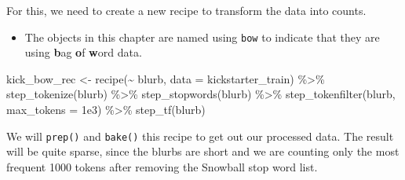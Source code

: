 \documentclass[
]{krantz}
\makeatletter
\newenvironment{Shaded}{\begin{snugshade}}{\end{snugshade}}
\newcommand{\AttributeTok}[1]{\textcolor[rgb]{0.77,0.63,0.00}{#1}}
\newcommand{\DecValTok}[1]{\textcolor[rgb]{0.00,0.00,0.81}{#1}}
\newcommand{\FloatTok}[1]{\textcolor[rgb]{0.00,0.00,0.81}{#1}}
\newcommand{\FunctionTok}[1]{\textcolor[rgb]{0.00,0.00,0.00}{#1}}
\newcommand{\NormalTok}[1]{#1}
\newcommand{\OtherTok}[1]{\textcolor[rgb]{0.56,0.35,0.01}{#1}}
\newcommand{\SpecialCharTok}[1]{\textcolor[rgb]{0.00,0.00,0.00}{#1}}
\newcommand{\StringTok}[1]{\textcolor[rgb]{0.31,0.60,0.02}{#1}}
\newenvironment{kframe}{%
\medskip{}
\setlength{\fboxsep}{.8em}
 \def\at@end@of@kframe{}%
 \ifinner\ifhmode%
  \def\at@end@of@kframe{\end{minipage}}%
  \begin{minipage}{\columnwidth}%
 \fi\fi%
 \def\FrameCommand##1{\hskip\@totalleftmargin \hskip-\fboxsep
 \colorbox{shadecolor}{##1}\hskip-\fboxsep
     \hskip-\linewidth \hskip-\@totalleftmargin \hskip\columnwidth}%
 \MakeFramed {\advance\hsize-\width
   \@totalleftmargin\z@ \linewidth\hsize
   \@setminipage}}%
 {\par\unskip\endMakeFramed%
 \at@end@of@kframe}
\renewenvironment{Shaded}{\begin{kframe}}{\end{kframe}}
\newenvironment{rmdblock}[1]
  {\begin{shaded*}
  \begin{itemize}[left = -1cm, labelsep = 1cm]
  \renewcommand{\labelitemi}{
    \raisebox{-.7\height}[0pt][0pt]{
      {\setkeys{Gin}{width=3em,keepaspectratio}\texttt{[image: images/\#1]}}
    }
  }
 
  \item
  }
  {
  \end{itemize}
  \end{shaded*}
  }
\newenvironment{rmdnote}
  {\begin{rmdblock}{note}}
  {\end{rmdblock}}
\makeatother
\begin{document}
For this, we need to create a new recipe to transform the data into counts.

\begin{rmdnote}
The objects in this chapter are named using \texttt{bow} to indicate
that they are using \textbf{b}ag \textbf{o}f \textbf{w}ord data.
\end{rmdnote}

\begin{Shaded}
\begin{Highlighting}[]
\NormalTok{kick\_bow\_rec }\OtherTok{\textless{}{-}} \FunctionTok{recipe}\NormalTok{(}\SpecialCharTok{\textasciitilde{}}\NormalTok{ blurb, }\AttributeTok{data =}\NormalTok{ kickstarter\_train) }\SpecialCharTok{\%\textgreater{}\%}
  \FunctionTok{step\_tokenize}\NormalTok{(blurb) }\SpecialCharTok{\%\textgreater{}\%}
  \FunctionTok{step\_stopwords}\NormalTok{(blurb) }\SpecialCharTok{\%\textgreater{}\%}
  \FunctionTok{step\_tokenfilter}\NormalTok{(blurb, }\AttributeTok{max\_tokens =} \FloatTok{1e3}\NormalTok{) }\SpecialCharTok{\%\textgreater{}\%}
  \FunctionTok{step\_tf}\NormalTok{(blurb)}
\end{Highlighting}
\end{Shaded}

We will \texttt{prep()} and \texttt{bake()} this recipe to get out our processed data. The result will be quite sparse, since the blurbs are short and we are counting only the most frequent 1000 tokens after removing the Snowball stop word list.

\begin{Shaded}
\end{Shaded}
\end{document}
